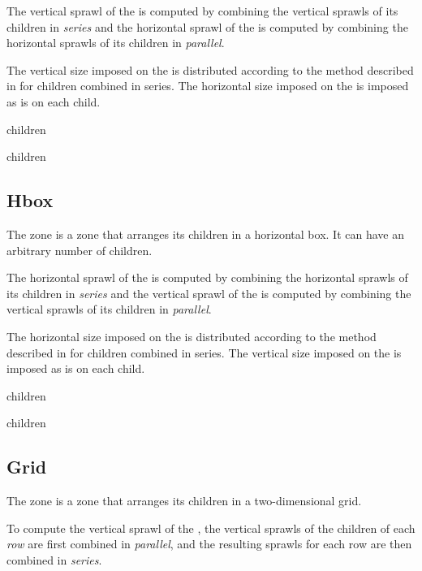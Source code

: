 The vertical sprawl of the  is computed by combining the
vertical sprawls of its children in \emph{series} and the horizontal
sprawl of the  is computed by combining the horizontal
sprawls of its children in \emph{parallel}.

The vertical size imposed on the  is distributed according
to the method described in 
for children combined in series.  The horizontal size imposed on the
 is imposed as is on each child. 


 {children}

 {\rest children}

\subsection{Hbox}
\label{sec-zones-layout-hbox}

The  zone is a zone that arranges its children in a
horizontal box.  It can have an arbitrary number of children.

The horizontal sprawl of the  is computed by combining the
horizontal sprawls of its children in \emph{series} and the vertical
sprawl of the  is computed by combining the vertical
sprawls of its children in \emph{parallel}.

The horizontal size imposed on the  is distributed according
to the method described in 
for children combined in series.  The vertical size imposed on the
 is imposed as is on each child. 


 {children}

 {\rest children}

\subsection{Grid}
\label{sec-zones-layout-grid}

The  zone is a zone that arranges its children in a
two-dimensional grid.  

To compute the vertical sprawl of the , the vertical
sprawls of the children of each \emph{row} are first combined in
\emph{parallel}, and the resulting sprawls for each row are then
combined in \emph{series}.  

